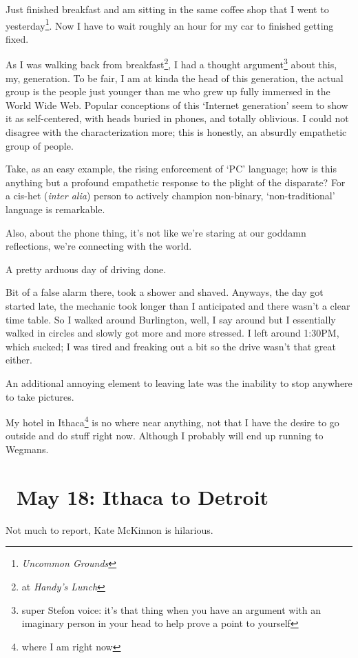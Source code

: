 \documentclass[../butidigress.tex]{subfiles}
\begin{document}
\entryskip

Just finished breakfast and am sitting in the same coffee shop that I went to yesterday\footnote{\textit{Uncommon Grounds}}.
Now I have to wait roughly an hour for my car to finished getting fixed.

As I was walking back from breakfast\footnote{at \textit{Handy's Lunch}}, I had a thought argument\footnote{super Stefon voice: it's that thing when you have an argument with an imaginary person in your head to help prove a point to yourself} about this, my, generation.
To be fair, I am at kinda the head of this generation, the actual group is the people just younger than me who grew up fully immersed in the World Wide Web.
Popular conceptions of this `Internet generation' seem to show it as self-centered, with heads buried in phones, and totally oblivious.
I could not disagree with the characterization more; this is honestly, an absurdly empathetic group of people.

Take, as an easy example, the rising enforcement of `PC' language; how is this anything but a profound empathetic response to the plight of the disparate?
For a cis-het (\textit{inter alia}) person to actively champion non-binary, `non-traditional' language is remarkable.

Also, about the phone thing, it's not like we're staring at our goddamn reflections, we're connecting with the world.

\entryskip

A pretty arduous day of driving done.

\entryskip

Bit of a false alarm there, took a shower and shaved.
Anyways, the day got started late, the mechanic took longer than I anticipated and there wasn't a clear time table.
So I walked around Burlington, well, I say around but I essentially walked in circles and slowly got more and more stressed.
I left around 1:30PM, which sucked; I was tired and freaking out a bit so the drive wasn't that great either.

An additional annoying element to leaving late was the inability to stop anywhere to take pictures.

My hotel in Ithaca\footnote{where I am right now} is no where near anything, not that I have the desire to go outside and do stuff right now.
Although I probably will end up running to Wegmans.

\section{\ May 18: Ithaca to Detroit}
Not much to report, Kate McKinnon is hilarious.
\end{document}
